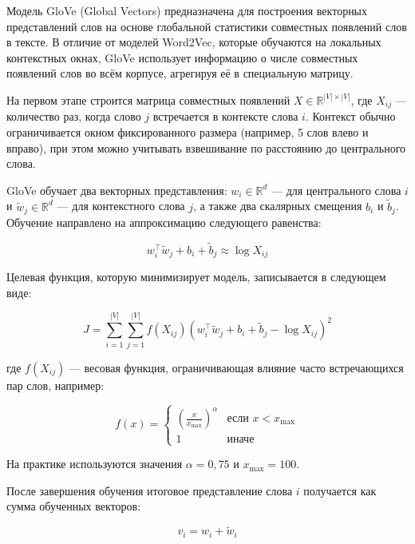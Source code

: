 \documentclass[coursework]{SCWorks}
\begin{document}
Модель GloVe (Global Vectors) предназначена для построения векторных представлений слов на основе глобальной статистики совместных появлений слов в тексте. В отличие от моделей Word2Vec, которые обучаются на локальных контекстных окнах, GloVe использует информацию о числе совместных появлений слов во всём корпусе, агрегируя её в специальную матрицу.

На первом этапе строится матрица совместных появлений $X \in \mathbb{R}^{|V| \times |V|}$, где $X_{ij}$ — количество раз, когда слово $j$ встречается в контексте слова $i$. Контекст обычно ограничивается окном фиксированного размера (например, 5 слов влево и вправо), при этом можно учитывать взвешивание по расстоянию до центрального слова.

GloVe обучает два векторных представления: $w_i \in \mathbb{R}^d$ — для центрального слова $i$ и $\tilde{w}_j \in \mathbb{R}^d$ — для контекстного слова $j$, а также два скалярных смещения $b_i$ и $\tilde{b}_j$. Обучение направлено на аппроксимацию следующего равенства:

\[
w_i^\top \tilde{w}_j + b_i + \tilde{b}_j \approx \log X_{ij}
\]

Целевая функция, которую минимизирует модель, записывается в следующем виде:

\[
J = \sum_{i=1}^{|V|} \sum_{j=1}^{|V|} f(X_{ij}) \left(w_i^\top \tilde{w}_j + b_i + \tilde{b}_j - \log X_{ij} \right)^2
\]

где $f(X_{ij})$ — весовая функция, ограничивающая влияние часто встречающихся пар слов, например:

\[
f(x) = 
\begin{cases}
\left(\frac{x}{x_{\text{max}}}\right)^\alpha & \text{если } x < x_{\text{max}} \\
1 & \text{иначе}
\end{cases}
\]

На практике используются значения $\alpha = 0{,}75$ и $x_{\text{max}} = 100$.


После завершения обучения итоговое представление слова $i$ получается как сумма обученных векторов:

\[
v_i = w_i + \tilde{w}_i
\]
\end{document}
